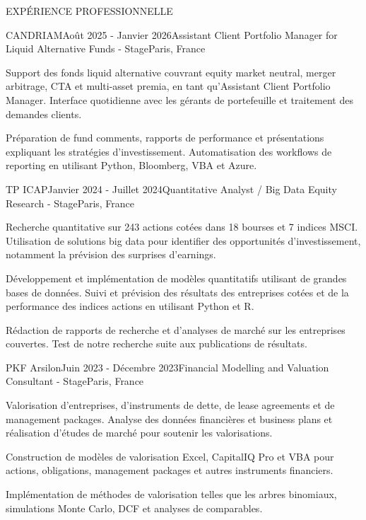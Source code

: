 \documentclass{resume} %
\begin{document}
\begin{rSection}{EXPÉRIENCE PROFESSIONNELLE}

    \begin{rSubsection}{CANDRIAM}{Août 2025 - Janvier 2026}{Assistant Client Portfolio Manager for Liquid Alternative Funds - Stage}{Paris, France}
        \item Support des fonds liquid alternative couvrant equity market neutral, merger arbitrage, CTA et multi-asset premia, en tant qu'Assistant Client Portfolio Manager. Interface quotidienne avec les gérants de portefeuille et traitement des demandes clients.
        \item Préparation de fund comments, rapports de performance et présentations expliquant les stratégies d'investissement. Automatisation des workflows de reporting en utilisant Python, Bloomberg, VBA et Azure.
    \end{rSubsection}
    
    \begin{rSubsection}{TP ICAP}{Janvier 2024 - Juillet 2024}{Quantitative Analyst / Big Data Equity Research - Stage}{Paris, France}
        \item Recherche quantitative sur 243 actions cotées dans 18 bourses et 7 indices MSCI. Utilisation de solutions big data pour identifier des opportunités d'investissement, notamment la prévision des surprises d'earnings.
        \item Développement et implémentation de modèles quantitatifs utilisant de grandes bases de données. Suivi et prévision des résultats des entreprises cotées et de la performance des indices actions en utilisant Python et R.
        \item Rédaction de rapports de recherche et d'analyses de marché sur les entreprises couvertes. Test de notre recherche suite aux publications de résultats.
    \end{rSubsection}
    
    \begin{rSubsection}{PKF Arsilon}{Juin 2023 - Décembre 2023}{Financial Modelling and Valuation Consultant - Stage}{Paris, France}
        \item Valorisation d'entreprises, d'instruments de dette, de lease agreements et de management packages. Analyse des données financières et business plans et réalisation d'études de marché pour soutenir les valorisations.
        \item Construction de modèles de valorisation Excel, CapitalIQ Pro et VBA pour actions, obligations, management packages et autres instruments financiers.
        \item Implémentation de méthodes de valorisation telles que les arbres binomiaux, simulations Monte Carlo, DCF et analyses de comparables.
    \end{rSubsection}
    

\end{rSection}
\end{document}
